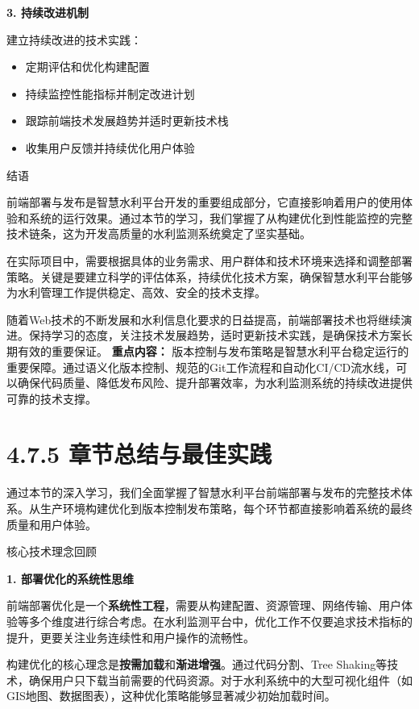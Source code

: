 {{\textbf{3. 持续改进机制}

建立持续改进的技术实践：

\begin{itemize}
\tightlist
\item
  定期评估和优化构建配置
\item
  持续监控性能指标并制定改进计划
\item
  跟踪前端技术发展趋势并适时更新技术栈
\item
  收集用户反馈并持续优化用户体验
\end{itemize}

 结语

前端部署与发布是智慧水利平台开发的重要组成部分，它直接影响着用户的使用体验和系统的运行效果。通过本节的学习，我们掌握了从构建优化到性能监控的完整技术链条，这为开发高质量的水利监测系统奠定了坚实基础。

在实际项目中，需要根据具体的业务需求、用户群体和技术环境来选择和调整部署策略。关键是要建立科学的评估体系，持续优化技术方案，确保智慧水利平台能够为水利管理工作提供稳定、高效、安全的技术支撑。

随着Web技术的不断发展和水利信息化要求的日益提高，前端部署技术也将继续演进。保持学习的态度，关注技术发展趋势，适时更新技术实践，是确保技术方案长期有效的重要保证。 \textbf{重点内容：} 版本控制与发布策略是智慧水利平台稳定运行的重要保障。通过语义化版本控制、规范的Git工作流程和自动化CI/CD流水线，可以确保代码质量、降低发布风险、提升部署效率，为水利监测系统的持续改进提供可靠的技术支撑。

\section{4.7.5 章节总结与最佳实践}

通过本节的深入学习，我们全面掌握了智慧水利平台前端部署与发布的完整技术体系。从生产环境构建优化到版本控制发布策略，每个环节都直接影响着系统的最终质量和用户体验。

 核心技术理念回顾

\textbf{1. 部署优化的系统性思维}

前端部署优化是一个\textbf{系统性工程}，需要从构建配置、资源管理、网络传输、用户体验等多个维度进行综合考虑。在水利监测平台中，优化工作不仅要追求技术指标的提升，更要关注业务连续性和用户操作的流畅性。

构建优化的核心理念是\textbf{按需加载}和\textbf{渐进增强}。通过代码分割、Tree Shaking等技术，确保用户只下载当前需要的代码资源。对于水利系统中的大型可视化组件（如GIS地图、数据图表），这种优化策略能够显著减少初始加载时间。

}}
